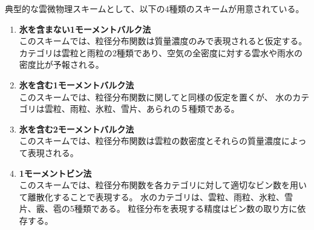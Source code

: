 典型的な雲微物理スキームとして、以下の4種類のスキームが用意されている。
\begin{enumerate}
\item {\bf 氷を含まない1モーメントバルク法\cite{kessler_1969}}\\
このスキームでは、粒径分布関数は質量濃度のみで表現されると仮定する。
カテゴリは雲粒と雨粒の2種類であり、空気の全密度に対する雲水や雨水の密度比が予報される。

\item {\bf 氷を含む1モーメントバルク法\cite{tomita_2008}}\\
このスキームでは、粒径分布関数に関して\cite{kessler_1969}と同様の仮定を置くが、
水のカテゴリは雲粒、雨粒、氷粒、雪片、あられの５種類である。

\item {\bf 氷を含む2モーメントバルク法\cite{sn_2014}}\\
このスキームでは、粒径分布関数は雲粒の数密度とそれらの質量濃度によって表現される。

\item {\bf 1モーメントビン法\cite{suzuki_etal_2010}}\\
このスキームでは、粒径分布関数を各カテゴリに対して適切なビン数を用いて離散化することで表現する。
水のカテゴリは、雲粒、雨粒、氷粒、雪片、霰、雹の5種類である。
粒径分布を表現する精度はビン数の取り方に依存する。


\end{enumerate}
